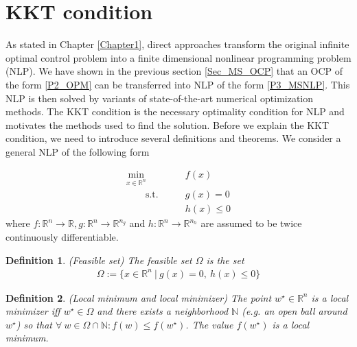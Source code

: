 \documentclass  [
  paper    = a4,
  BCOR     = 10mm,
  twoside,
  fontsize = 12pt,
  fleqn,
  toc      = bibnumbered,
  toc      = listofnumbered,
  numbers  = noendperiod,
  headings = normal,
  listof   = leveldown,
  version  = 3.03
]                                       {scrreprt}
\newcommand{\<}{\langle}
\renewcommand{\>}{\rangle}
\newtheorem{definition}{Definition}
\begin{document}
\section{KKT condition}
\label{Sec_KKT}
As stated in Chapter \ref{Chapter1}, direct approaches transform the original infinite optimal control problem into a finite dimensional nonlinear programming problem (NLP). We have shown in the previous section \ref{Sec_MS_OCP} that an OCP of the form \ref{P2_OPM} can be transferred into NLP of the form \ref{P3_MSNLP}. This NLP is then solved by variants of state-of-the-art numerical optimization methods. The KKT condition is the necessary optimality condition for NLP and motivates the methods used to find the solution. Before we explain the KKT condition, we need to introduce several definitions and theorems. We consider a general NLP of the following form
 

\begin{equation}
	\label{eq:OCP_discret_compact}
	\begin{aligned}
		\underset{x \in \mathbb{R}^n}{\text{min}} \qquad &f(x)\\
		\qquad \text{s.t.}\qquad&  g(x) = 0   \\
		&  h(x)\leq 0 
	\end{aligned}
\end{equation}
where $f: \mathbb{R}^n \rightarrow \mathbb{R}, g: \mathbb{R}^n \rightarrow \mathbb{R}^{n_g}$ and $h: \mathbb{R}^n \rightarrow \mathbb{R}^{n_h}$ are assumed to be twice continuously differentiable.

\begin{definition}(Feasible set) The feasible set $\Omega$ is the set 
	\begin{align}
		\Omega:= \{x \in \mathbb{R}^n \ | \ g(x)= 0 , \ h(x)\leq 0 \}
	\end{align}
\end{definition}



\begin{definition}(Local minimum and local minimizer) The point $w^\star \in \mathbb{R}^n$ is a local minimizer iff $w^\star \in  \Omega$ and there exists a neighborhood $\mathbb{N}$ (e.g. an open ball around $w^\star$) so that $ \forall \ w \in \Omega \cap \mathbb{N}: f(w)\leq f(w^\star)$. The value $f(w^\star)$ is a local minimum.
\end{definition}
\end{document}
